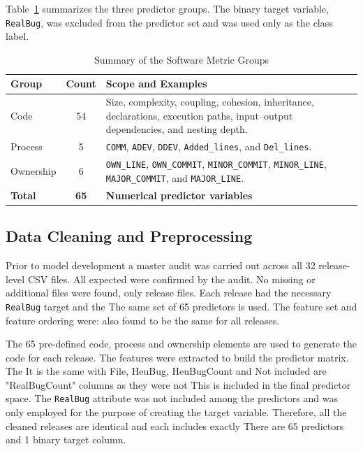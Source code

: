 \documentclass[conference]{IEEEtran}
\begin{document}
Table~\ref{tab:metric-groups} summarizes the three predictor groups.
The binary target variable, \texttt{RealBug}, was excluded from the
predictor set and was used only as the class label.

\begin{table}[H]
\caption{Summary of the Software Metric Groups}
\label{tab:metric-groups}
\centering
\begin{tabular}{@{}lcp{4.7cm}@{}}
\toprule
\textbf{Group} & \textbf{Count} & \textbf{Scope and Examples} \\
\midrule
Code
& 54
& Size, complexity, coupling, cohesion, inheritance, declarations,
execution paths, input--output dependencies, and nesting depth. \\

Process
& 5
& \texttt{COMM}, \texttt{ADEV}, \texttt{DDEV},
\texttt{Added\_lines}, and \texttt{Del\_lines}. \\

Ownership
& 6
& \texttt{OWN\_LINE}, \texttt{OWN\_COMMIT},
\texttt{MINOR\_COMMIT}, \texttt{MINOR\_LINE},
\texttt{MAJOR\_COMMIT}, and \texttt{MAJOR\_LINE}. \\
\midrule
\textbf{Total}
& \textbf{65}
& \textbf{Numerical predictor variables} \\
\bottomrule
\end{tabular}
\end{table}

\subsection{Data Cleaning and Preprocessing}
\label{subsec:data-preprocessing}

Prior to model development a master audit was carried out across all
32 release-level CSV files. All expected were confirmed by the audit.
No missing or additional files were found, only release files.
Each release had the necessary \texttt{RealBug} target and the
The same set of 65 predictors is used. The feature set and feature ordering were:
also found to be the same for all releases.

The 65 pre-defined code, process and ownership elements are used to generate the code for each release.
The features were extracted to build the predictor matrix. The
It is the same with File, HeuBug, HeuBugCount and
Not included are "RealBugCount" columns as they were not
This is included in the final predictor space. The \texttt{RealBug} attribute
was not included among the predictors and was only employed for the purpose of creating the
target variable. Therefore, all the cleaned releases are identical and each includes exactly
There are 65 predictors and 1 binary target column.
\end{document}
